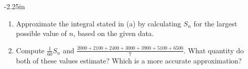 \begin{adjustwidth*}{}{-2.25in}
\begin{multicols*}{2}
\begin{enumerate}[1),start=27]
		\item Approximate the integral stated in (a) by calculating $S_n$ for the largest possible value of $n$, based on the given data.
		
		\item Compute $\frac{1}{60} S_n$ and $\frac{2000+2100+2400+3000+3900+5100+6500}{7}$.  What quantity do both of these values estimate?  Which is a more accurate approximation?
	\ea
\end{enumerate}

\end{multicols*}
\end{adjustwidth*}

\afterexercises